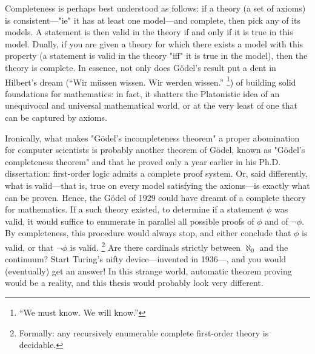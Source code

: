 Completeness is perhaps best understood as follows:
if a theory (a set of axioms) is consistent---"ie" it has at least one model---and complete, 
then pick any of its models. A statement is then valid in the theory if and only
if it is true in this model. Dually, if you are given a theory for which
there exists a model with this property (a statement is valid in the theory "iff" it
is true in the model), then the theory is complete.
In essence, not only does Gödel's result put a dent in Hilbert's dream
(``Wir müssen wissen. Wir werden wissen.''%
\footnote{``We must know. We will know.''}) of building solid foundations for mathematics:
in fact, it shatters the Platonistic idea of an unequivocal and universal mathematical world, or 
at the very least of one that can be captured by axioms.

Ironically, what makes "Gödel's incompleteness theorem" a proper
abomination for computer scientists is probably another theorem of Gödel,
known as "Gödel's completeness theorem" and that he proved
only a year earlier in his Ph.D. dissertation: 
first-order logic admits a complete proof system. Or, said differently,
what is valid---that is, true on every model satisfying the axioms---is exactly what
can be proven. 
Hence, the Gödel of 1929 could have dreamt of a complete theory for mathematics.
If a such theory existed, to determine if a statement $\phi$ was valid, it would suffice
to enumerate in parallel all possible proofs of $\phi$ and of $\neg \phi$. By completeness, this 
procedure would always stop, and either conclude that $\phi$ is valid, or that
$\neg \phi$ is valid.%
\footnote{Formally: any recursively enumerable complete first-order theory is decidable.}
Are there cardinals strictly between $\aleph_0$ and the continuum?
Start Turing's nifty device---invented in 1936---, and you would (eventually) get an answer! In this strange world, automatic theorem proving would be a reality,
and this thesis would probably look very different.

